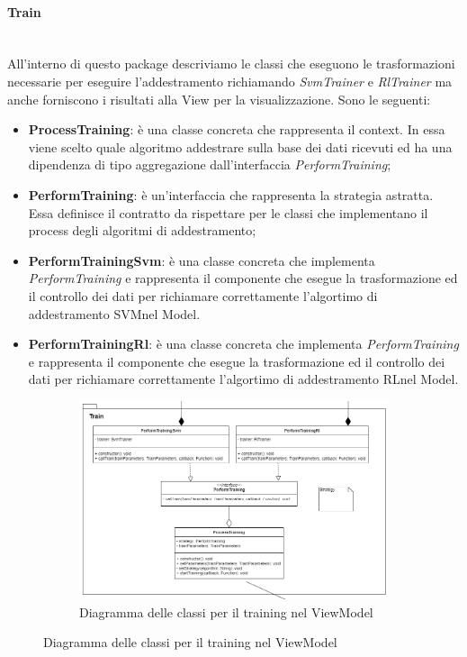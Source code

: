 		\paragraph*{Train} \mbox{} \\[1mm]
		All'interno di questo package descriviamo le classi che eseguono le trasformazioni necessarie per eseguire l'addestramento richiamando \textit{SvmTrainer} e \textit{RlTrainer} ma anche forniscono i risultati alla View per la visualizzazione. Sono le seguenti:
		\begin{itemize}
			\item \textbf{ProcessTraining}: è una classe concreta che rappresenta il context. In essa viene scelto quale algoritmo addestrare sulla base dei dati ricevuti ed ha una dipendenza di tipo aggregazione dall'interfaccia \textit{PerformTraining};
			\item \textbf{PerformTraining}: è un'interfaccia che rappresenta la strategia astratta. Essa definisce il contratto da rispettare per le classi che implementano il process degli algoritmi di addestramento;
			\item \textbf{PerformTrainingSvm}: è una classe concreta che implementa \textit{PerformTraining} e rappresenta il componente che esegue la trasformazione ed il controllo dei dati per richiamare correttamente l'algortimo di addestramento SVM\glosp nel Model.
			\item \textbf{PerformTrainingRl}: è una classe concreta che implementa \textit{PerformTraining} e rappresenta il componente che esegue la trasformazione ed il controllo dei dati per richiamare correttamente l'algortimo di addestramento RL\glosp nel Model.
		\end{itemize}
		\mbox{}
		\begin{landscape}
			\begin{figure}
				\begin{figure} [H]
					\includegraphics[width=\linewidth]{img/Diagrammi/ViewModel-train-app.png}
					\caption{Diagramma delle classi per il training nel ViewModel}
				\end{figure}
			\end{figure}
		\end{landscape}
